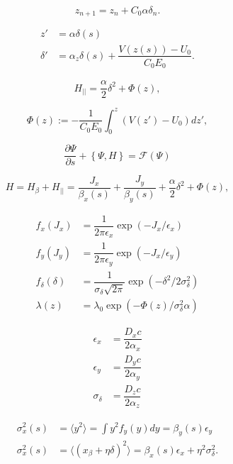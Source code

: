 \begin{equation}
    z_{n+1} = z_n + C_0 \alpha \delta_n.
\end{equation}

\begin{align}
    z' & = \alpha\delta(s) \\
    \delta ' & = \alpha_z \delta(s) + \dfrac{V(z(s))-U_0}{C_0E_0}.
\end{align}

\begin{equation}
    H_{||} = \dfrac{\alpha}{2}\delta^2 + \Phi(z),
\end{equation}

\begin{equation}
    \Phi(z) := -\dfrac{1}{C_0 E_0}\int_0^z \left(V(z') - U_0\right)dz',
\end{equation}

\begin{equation}
    \dfrac{\partial \Psi}{\partial s} + \left\{\Psi , H\right\}  = \mathcal{F}\left(\Psi\right)
\end{equation}

\[
H = H_\beta + H_{||} =  \dfrac{J_x}{\beta_x(s)} + \dfrac{J_y}{\beta_y(s)} + \dfrac{\alpha}{2}\delta^2 + \Phi(z),
\]


\begin{align}
    f_x(J_x) & = \dfrac{1}{2\pi \epsilon_x}\exp\left(-J_x/\epsilon_x\right) \\
    f_y(J_y) & = \dfrac{1}{2\pi \epsilon_y}\exp\left(-J_x/\epsilon_y\right) \\
    f_{\delta}(\delta) & = \dfrac{1}{\sigma_{\delta}\sqrt{2\pi}}\exp\left(-\delta^2/2\sigma^2_\delta\right) \\
    \lambda(z) & = \lambda_0\exp\left(-\Phi(z)/\sigma^2_\delta\alpha\right)
    \label{dist}
\end{align}

\begin{align}
    \epsilon_x & = \dfrac{D_x c}{2 \alpha_x} \\
    \epsilon_y & = \dfrac{D_y c}{2 \alpha_y} \\
    \sigma_\delta & = \dfrac{D_z c}{2 \alpha_z} 
\end{align}


\begin{align}
    \sigma_x^2(s) & = \langle y^2 \rangle = \int y^2 f_{y}(y) dy = \beta_y(s) \epsilon_y\\
    \sigma_x^2(s) &= \langle \left(x_\beta + \eta \delta \right)^2 \rangle = \beta_x(s) \epsilon_x + \eta^2 \sigma_\delta^2.
\end{align}

